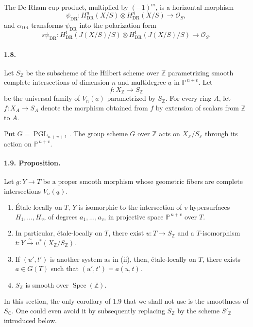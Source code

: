 \documentclass[10pt]{article}
\newcommand{\C}{\mathbb C}
\newcommand{\Pj}{\mathbb P}
\newcommand{\Z}{\mathbb Z}
\newcommand{\DR}{\mathrm{DR}}
\newcommand{\Spec}{\operatorname{Spec}}
\newcommand{\PGL}{\operatorname{PGL}}
\newcommand{\iso}{\xrightarrow{\sim}}
\begin{document}
The De Rham cup product, multiplied by \((-1)^m\), is a horizontal morphism
\[
\tag{1.7.2}
\psi_{\DR}:H^n_{\DR}(X/S)\otimes H^n_{\DR}(X/S)\longrightarrow\mathcal O_S,
\]
and \(\alpha_{\DR}\) transforms \(\psi_{\DR}\) into the polarization form
\[
\tag{1.7.3}
s\psi_{\DR}:H^1_{\DR}(J(X/S)/S)\otimes H^1_{\DR}(J(X/S)/S)\longrightarrow\mathcal O_S.
\]

\paragraph{1.8.} Let \(S_\Z\) be the subscheme of the Hilbert scheme over \(\Z\) parametrizing smooth complete intersections of dimension \(n\) and multidegree \(\underline a\) in \(\Pj^{\,n+v}\). Let
\[
f:X_\Z\longrightarrow S_\Z
\]
be the universal family of \(V_n(\underline a)\) parametrized by \(S_\Z\). For every ring \(A\), let \(f:X_A\to S_A\) denote the morphism obtained from \(f\) by extension of scalars from \(\Z\) to \(A\).

Put \(G=\PGL_{n+v+1}\). The group scheme \(G\) over \(\Z\) acts on \(X_\Z/S_\Z\) through its action on \(\Pj^{\,n+v}\).

\paragraph{1.9. Proposition.} Let \(g:Y\to T\) be a proper smooth morphism whose geometric fibers are complete intersections \(V_n(\underline a)\).
\begin{enumerate}[label=(\roman*)]
\item Étale-locally on \(T\), \(Y\) is isomorphic to the intersection of \(v\) hypersurfaces \(H_1,\ldots,H_v\), of degrees \(a_1,\ldots,a_v\), in projective space \(\Pj^{\,n+v}\) over \(T\).
\item In particular, étale-locally on \(T\), there exist \(u:T\to S_\Z\) and a \(T\)-isomorphism \(t:Y\iso u^*(X_\Z/S_\Z)\).
\item If \((u',t')\) is another system as in (ii), then, étale-locally on \(T\), there exists \(a\in G(T)\) such that \((u',t')=a(u,t)\).
\item \(S_\Z\) is smooth over \(\Spec(\Z)\).
\end{enumerate}

In this section, the only corollary of 1.9 that we shall not use is the smoothness of \(S_\C\). One could even avoid it by subsequently replacing \(S_\Z\) by the scheme \(S'_\Z\) introduced below.
\end{document}
